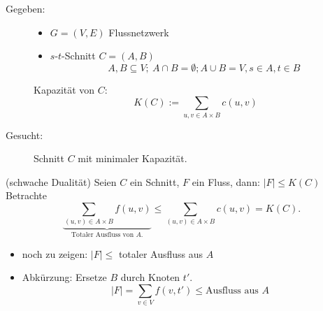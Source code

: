 \begin{description}
\item[Gegeben:]
    \begin{itemize}
    \item   $G = (V, E)$ Flussnetzwerk
    \item   $s$-$t$-Schnitt $C = (A,B)$
            \[A,B \subseteq V{;}\ A \cap B = \emptyset; A \cup B = V, s \in A, t \in B\]
    \end{itemize}
    Kapazität von $C$:
    \[K(C) := \sum\limits_{u,v \in A \times B} c(u,v)\]
\item[Gesucht:]
    Schnitt $C$ mit minimaler Kapazität.
\end{description}
\Lemma (schwache Dualität)
    Seien $C$ ein Schnitt, $F$ ein Fluss, dann: $|F| \leq K(C)$
\Bew Betrachte
    \[\underbrace{\sum\limits_{(u,v) \in A \times B} f(u,v)}_{\text{Totaler Ausfluss von $A$.}} \leq \sum\limits_{(u,v) \in A \times B} c(u,v) = K(C).\]
\begin{itemize}
\item   noch zu zeigen: $|F| \leq$ totaler Ausfluss aus $A$
\item   Abkürzung: Ersetze $B$ durch Knoten $t'$.
        \[|F| = \sum\limits_{v \in V} f(v,t') \leq \text{Ausfluss aus $A$}\]
\end{itemize}

    